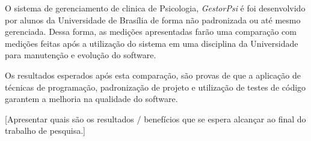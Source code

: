 
O sistema de gerenciamento de clinica de Psicologia, \textit{GestorPsi} é foi desenvolvido por alunos da Universidade de Brasília de forma não padronizada ou até mesmo gerenciada. Dessa forma, as medições apresentadas farão uma comparação com medições feitas após a utilização do sistema em uma disciplina da Universidade para manutenção e evolução do software.

Os resultados esperados após esta comparação, são provas de que a aplicação de técnicas de programação, padronização de projeto e utilização de testes de código garantem a melhoria na qualidade do software.


[Apresentar quais são os resultados / benefícios que se espera alcançar ao final do trabalho de pesquisa.]
